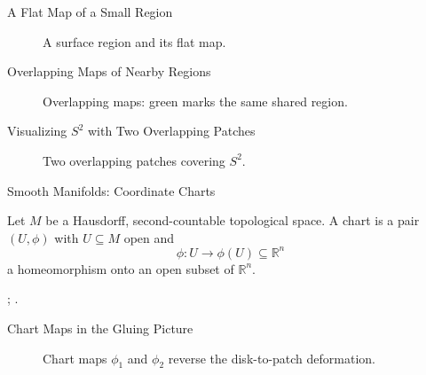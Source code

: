\documentclass[aspectratio=169,11pt]{beamer}
\newcommand{\sources}[1]{\par\vfill{\scriptsize\color{black!75}#1\par}}
\begin{document}
\begin{frame}{A Flat Map of a Small Region}
  \begin{figure}
    \centering
    \resizebox{!}{0.61\textheight}{}
    \caption{A surface region and its flat map.}
    \label{fig:slides-flat-map}
  \end{figure}
\end{frame}

\begin{frame}{Overlapping Maps of Nearby Regions}
  \begin{figure}
    \centering
    \resizebox{!}{0.59\textheight}{}
    \caption{Overlapping maps: \textcolor{green!45!black}{green} marks the same shared region.}
    \label{fig:slides-overlapping-maps}
  \end{figure}
\end{frame}

\begin{frame}{Visualizing $S^2$ with Two Overlapping Patches}
  \begin{figure}
    \centering
    \resizebox{0.98\textwidth}{!}{}
    \caption{Two overlapping patches covering $S^2$.}
    \label{fig:slides-gluing-sphere}
  \end{figure}
\end{frame}

\begin{frame}{Smooth Manifolds: Coordinate Charts}
  \begin{definition}
    Let $M$ be a Hausdorff, second-countable topological space.
    A chart is a pair $(U,\phi)$ with $U\subseteq M$ open and
    \begin{equation}
      \label{eq:slides-coordinate-chart}
      \phi\colon U\longrightarrow\phi(U)\subseteq\mathbb{R}^n
    \end{equation}
    a homeomorphism onto an open subset of $\mathbb{R}^n$.
  \end{definition}
  \sources{\cite[Chapter~1, pp.~11--13]{lee2013smooth};
    \cite[Chapter~2]{tu2011introduction}.}
\end{frame}

\begin{frame}{Chart Maps in the Gluing Picture}
  \begin{figure}
    \centering
    \begingroup
      \def\showchartmaps{1}
      \resizebox{0.98\textwidth}{!}{}
    \endgroup
    \caption{Chart maps $\phi_1$ and $\phi_2$ reverse the disk-to-patch deformation.}
    \label{fig:slides-gluing-chart-maps}
  \end{figure}
\end{frame}
\end{document}

